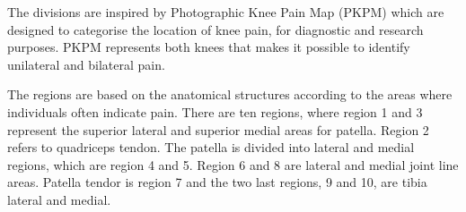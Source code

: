 \noindent
The divisions are inspired by Photographic Knee Pain Map (PKPM) which are designed to categorise the location of knee pain, for diagnostic and research purposes. PKPM represents both knees that makes it possible to identify unilateral and bilateral pain.\citep{Elson2010}

\noindent
The regions are based on the anatomical structures according to the areas where individuals often indicate pain.
There are ten regions, where region 1 and 3 represent the superior lateral and superior medial areas for patella. Region 2 refers to quadriceps tendon. The patella is divided into lateral and medial regions, which are region 4 and 5. Region 6 and 8 are lateral and medial joint line areas. Patella tendor is region 7 and the two last regions, 9 and 10, are tibia lateral and medial.\citep{Elson2010}

\newpage
